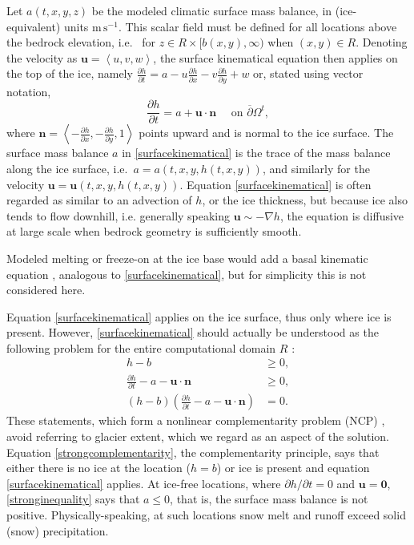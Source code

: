 \documentclass[letterpaper,final,12pt,reqno]{amsart}
\newcommand{\grad}{\nabla}
\newcommand{\bn}{\mathbf{n}}
\newcommand{\bu}{\mathbf{u}}
\newcommand{\bzero}{\bm{0}}
\begin{document}
Let $a(t,x,y,z)$ be the modeled climatic surface mass balance, in (ice-equivalent) units $\text{m}\,\text{s}^{-1}$.  This scalar field must be defined for all locations above the bedrock elevation, i.e.~ for $z \in R\times[b(x,y),\infty)$ when $(x,y)\in R$.  Denoting the velocity as $\bu=\left<u,v,w\right>$, the surface kinematical equation \cite{GreveBlatter2009} then applies on the top of the ice, namely $\frac{\partial h}{\partial t} = a - u \frac{\partial h}{\partial x} - v \frac{\partial h}{\partial y} + w$ or, stated using vector notation,
\begin{equation}
\frac{\partial h}{\partial t} = a + \bu \cdot \bn \quad \text{ on } \overline{\partial}\Omega^t, \label{surfacekinematical}
\end{equation}
where $\bn = \left<-\frac{\partial h}{\partial x},-\frac{\partial h}{\partial y},1\right>$ points upward and is normal to the ice surface.  The surface mass balance $a$ in \eqref{surfacekinematical} is the trace \cite{Evans2010} of the mass balance along the ice surface, i.e.~$a = a(t,x,y,h(t,x,y))$, and similarly for the velocity $\bu = \bu(t,x,y,h(t,x,y))$.  Equation \eqref{surfacekinematical} is often regarded as similar to an advection of $h$, or the ice thickness, but because ice also tends to flow downhill, i.e. generally speaking $\bu \sim -\grad h$, the equation is diffusive at large scale when bedrock geometry is sufficiently smooth.

Modeled melting or freeze-on at the ice base would add a basal kinematic equation \cite[for example]{Aschwandenetal2012}, analogous to \eqref{surfacekinematical}, but for simplicity this is not considered here.

Equation \eqref{surfacekinematical} applies on the ice surface, thus only where ice is present.  However, \eqref{surfacekinematical} should actually be understood as the following problem for the entire computational domain $R$ \cite{Bueler2016,Calvoetal2002,JouvetBueler2012,SchoofHewitt2013}:
\begin{align}
h-b &\ge 0, \label{strongadmissibility} \\
\frac{\partial h}{\partial t} - a - \bu \cdot \bn &\ge 0, \label{stronginequality} \\
(h-b) \left(\frac{\partial h}{\partial t} - a - \bu \cdot \bn\right) &= 0. \label{strongcomplementarity}
\end{align}
These statements, which form a nonlinear complementarity problem (NCP) \cite{KinderlehrerStampacchia1980}, avoid referring to glacier extent, which we regard as an aspect of the solution.  Equation \eqref{strongcomplementarity}, the complementarity principle, says that either there is no ice at the location ($h=b$) or ice is present and equation \eqref{surfacekinematical} applies.  At ice-free locations, where $\partial h/\partial t=0$ and $\bu=\bzero$, \eqref{stronginequality} says that $a \le 0$, that is, the surface mass balance is not positive.  Physically-speaking, at such locations snow melt and runoff exceed solid (snow) precipitation.
\end{document}

